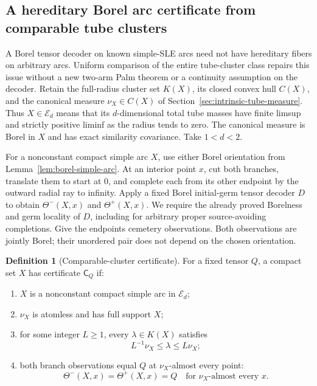 \documentclass[11pt]{article}
\theoremstyle{definition}\newtheorem{definition}[theorem]{Definition}
\theoremstyle{remark}\newtheorem{remark}[theorem]{Remark}
\begin{document}
\subsection{A hereditary Borel arc certificate from comparable tube clusters}
\label{sec:hereditary-cluster-certificate}

A Borel tensor decoder on known simple-SLE arcs need not have hereditary
fibers on arbitrary arcs. Uniform comparison of the entire tube-cluster
class repairs this issue without a new two-arm Palm theorem or a
continuity assumption on the decoder. Retain the full-radius cluster
set $K(X)$, its closed convex hull $C(X)$, and the canonical measure
$\nu_X\in C(X)$ of Section~\ref{sec:intrinsic-tube-measure}.
Thus $X\in\mathcal E_d$ means that its $d$-dimensional total tube
masses have finite limsup and strictly positive liminf as the radius
tends to zero. The canonical measure is Borel in $X$ and has exact
similarity covariance. Take $1<d<2$.

For a nonconstant compact simple arc $X$, use either Borel orientation
from Lemma~\ref{lem:borel-simple-arc}. At an interior point $x$, cut
both branches, translate them to start at $0$, and complete each from
its other endpoint by the outward radial ray to infinity. Apply a
fixed Borel initial-germ tensor decoder $D$ to obtain
$\Theta^-(X,x)$ and $\Theta^+(X,x)$. We require the already proved
Borelness and germ locality of $D$, including for arbitrary proper
source-avoiding completions. Give the endpoints cemetery observations.
Both observations are jointly Borel; their unordered pair does not
depend on the chosen orientation.

\begin{definition}[Comparable-cluster certificate]
\label{def:comparable-cluster-certificate}
For a fixed tensor $Q$, a compact set $X$ has certificate $\mathsf C_Q$
if:
\begin{enumerate}
\item $X$ is a nonconstant compact simple arc in $\mathcal E_d$;
\item $\nu_X$ is atomless and has full support $X$;
\item for some integer $L\ge1$, every $\lambda\in K(X)$ satisfies
 \[
  L^{-1}\nu_X\le\lambda\le L\nu_X;
  \tag{HC1}
 \]
\item both branch observations equal $Q$ at $\nu_X$-almost every point:
 \[
   \Theta^-(X,x)=\Theta^+(X,x)=Q
          \quad\text{for }\nu_X\text{-almost every }x.
   \tag{HC2}
 \]
\end{enumerate}
\end{definition}
\end{document}
